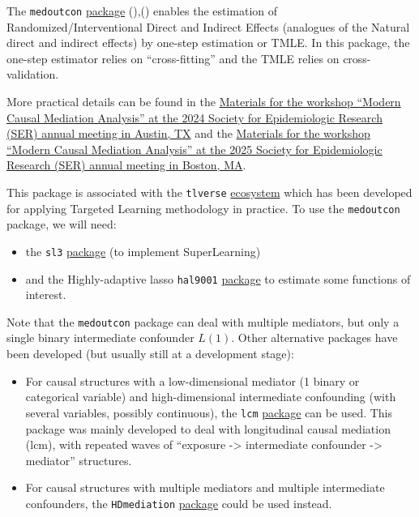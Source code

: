 \documentclass[
]{book}
\providecommand{\tightlist}{%
  \setlength{\itemsep}{0pt}\setlength{\parskip}{0pt}}
\begin{document}
The \texttt{medoutcon} \href{https://github.com/nhejazi/medoutcon}{package} (),() enables the estimation of Randomized/Interventional Direct and Indirect Effects (analogues of the Natural direct and indirect effects) by one-step estimation or TMLE. In this package, the one-step estimator relies on ``cross-fitting'' and the TMLE relies on cross-validation.

More practical details can be found in the \href{https://codex.nimahejazi.org/ser2024_mediation_workshop/}{Materials for the workshop ``Modern Causal Mediation Analysis'' at the 2024 Society for Epidemiologic Research (SER) annual meeting in Austin, TX} and the \href{https://codex.nimahejazi.org/ser2025_mediation_workshop/}{Materials for the workshop ``Modern Causal Mediation Analysis'' at the 2025 Society for Epidemiologic Research (SER) annual meeting in Boston, MA}.

This package is associated with the \texttt{tlverse} \href{https://tlverse.org/tlverse-handbook/}{ecosystem} which has been developed for applying Targeted Learning methodology in practice. To use the \texttt{medoutcon} package, we will need:

\begin{itemize}
\tightlist
\item
  the \texttt{sl3} \href{https://github.com/tlverse/sl3}{package} (to implement SuperLearning)
\item
  and the Highly-adaptive lasso \texttt{hal9001} \href{https://cran.r-project.org/web/packages/hal9001/index.html}{package} to estimate some functions of interest.
\end{itemize}

Note that the \texttt{medoutcon} package can deal with multiple mediators, but only a single binary intermediate confounder \(L(1)\). Other alternative packages have been developed (but usually still at a development stage):

\begin{itemize}
\tightlist
\item
  For causal structures with a low-dimensional mediator (1 binary or categorical variable) and high-dimensional intermediate confounding (with several variables, possibly continuous), the \texttt{lcm} \href{https://github.com/nt-williams/lcm}{package} can be used. This package was mainly developed to deal with longitudinal causal mediation (lcm), with repeated waves of ``exposure -\textgreater{} intermediate confounder -\textgreater{} mediator'' structures.
\item
  For causal structures with multiple mediators and multiple intermediate confounders, the \texttt{HDmediation} \href{https://github.com/nt-williams/HDmediation}{package} could be used instead.
\end{itemize}
\end{document}
